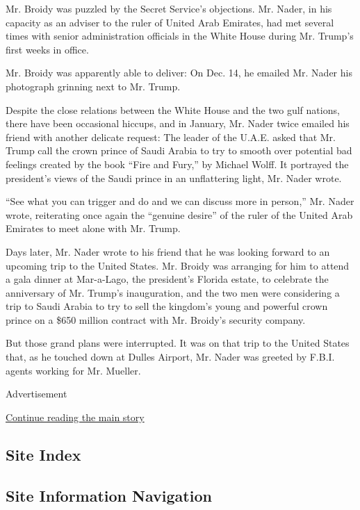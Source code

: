 Mr. Broidy was puzzled by the Secret Service's objections. Mr. Nader, in
his capacity as an adviser to the ruler of United Arab Emirates, had met
several times with senior administration officials in the White House
during Mr. Trump's first weeks in office.

Mr. Broidy was apparently able to deliver: On Dec. 14, he emailed Mr.
Nader his photograph grinning next to Mr. Trump.

Despite the close relations between the White House and the two gulf
nations, there have been occasional hiccups, and in January, Mr. Nader
twice emailed his friend with another delicate request: The leader of
the U.A.E. asked that Mr. Trump call the crown prince of Saudi Arabia to
try to smooth over potential bad feelings created by the book ``Fire and
Fury,'' by Michael Wolff. It portrayed the president's views of the
Saudi prince in an unflattering light, Mr. Nader wrote.

``See what you can trigger and do and we can discuss more in person,''
Mr. Nader wrote, reiterating once again the ``genuine desire'' of the
ruler of the United Arab Emirates to meet alone with Mr. Trump.

Days later, Mr. Nader wrote to his friend that he was looking forward to
an upcoming trip to the United States. Mr. Broidy was arranging for him
to attend a gala dinner at Mar-a-Lago, the president's Florida estate,
to celebrate the anniversary of Mr. Trump's inauguration, and the two
men were considering a trip to Saudi Arabia to try to sell the kingdom's
young and powerful crown prince on a \$650 million contract with Mr.
Broidy's security company.

But those grand plans were interrupted. It was on that trip to the
United States that, as he touched down at Dulles Airport, Mr. Nader was
greeted by F.B.I. agents working for Mr. Mueller.

Advertisement

\protect\hyperlink{after-bottom}{Continue reading the main story}

\hypertarget{site-index}{%
\subsection{Site Index}\label{site-index}}

\hypertarget{site-information-navigation}{%
\subsection{Site Information
Navigation}\label{site-information-navigation}}

